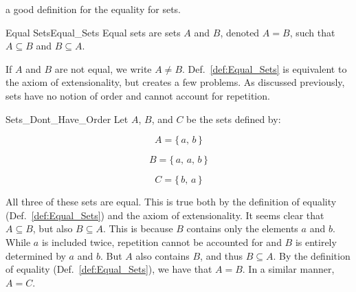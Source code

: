             a good definition for the equality for sets.
            \begin{fdefinition}{Equal Sets}{Equal_Sets}
                Equal sets are sets $A$ and $B$, denoted $A=B$, such that
                $A\subseteq{B}$ and $B\subseteq{A}$.
            \end{fdefinition}
            If $A$ and $B$ are not equal, we write $A\ne{B}$.
            Def.~\ref{def:Equal_Sets} is equivalent to the axiom of
            extensionality, but creates a few problems. As discussed
            previously, sets have no notion of order and cannot account
            for repetition.
            \begin{lexample}{}{Sets_Dont_Have_Order}
                Let $A$, $B$, and $C$ be the sets defined by:
                \par
                \begin{minipage}[b]{0.32\textwidth}
                    \begin{equation}
                        A=\{\,a,\,b\,\}
                    \end{equation}
                \end{minipage}
                \hfill
                \begin{minipage}[b]{0.32\textwidth}
                    \begin{equation}
                        B=\{\,a,\,a,\,b\,\}
                    \end{equation}
                \end{minipage}
                \hfill
                \begin{minipage}[b]{0.32\textwidth}
                    \begin{equation}
                        C=\{\,b,\,a\,\}
                    \end{equation}
                \end{minipage}
                \par\vspace{2.5ex}
                All three of these sets are equal. This is true both by the
                definition of equality (Def.~\ref{def:Equal_Sets}) and the
                axiom of extensionality. It seems clear that $A\subseteq{B}$,
                but also $B\subseteq{A}$. This is because $B$ contains only
                the elements $a$ and $b$. While $a$ is included twice,
                repetition cannot be accounted for and $B$ is entirely
                determined by $a$ and $b$. But $A$ also contains $B$, and thus
                $B\subseteq{A}$. By the definition of equality
                (Def.~\ref{def:Equal_Sets}), we have that $A=B$. In a similar
                manner, $A=C$.
            \end{lexample}
